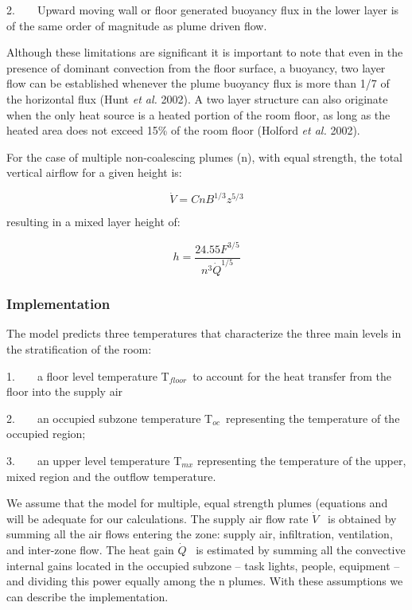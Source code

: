 2.~~~~Upward moving wall or floor generated buoyancy flux in the lower layer is of the same order of magnitude as plume driven flow.

Although these limitations are significant it is important to note that even in the presence of dominant convection from the floor surface, a buoyancy, two layer flow can be established whenever the plume buoyancy flux is more than 1/7 of the horizontal flux (Hunt \emph{et al.} 2002). A two layer structure can also originate when the only heat source is a heated portion of the room floor, as long as the heated area does not exceed 15\% of the room floor (Holford \emph{et al.} 2002).

For the case of multiple non-coalescing plumes (n), with equal strength, the total vertical airflow for a given height is:

\begin{equation}
  \dot{V} = CnB^{1/3}z^{5/3}
\end{equation}

resulting in a mixed layer height of:

\begin{equation}
  h = \frac{24.55F^{3/5}}{{n^3 \dot{Q}}^{1/5}}
\end{equation}

\subsubsection{Implementation}\label{implementation}

The model predicts three temperatures that characterize the three main levels in the stratification of the room:

1.~~~~a floor level temperature T\(_{floor}\)~to account for the heat transfer from the floor into the supply air

2.~~~~an occupied subzone temperature T\(_{oc}\)~representing the temperature of the occupied region;

3.~~~~an upper level temperature T\(_{mx}\) representing the temperature of the upper, mixed region and the outflow temperature.

We assume that the model for multiple, equal strength plumes (equations and will be adequate for our calculations. The supply air flow rate \(\dot V\) ~is obtained by summing all the air flows entering the zone: supply air, infiltration, ventilation, and inter-zone flow. The heat gain \(\dot Q\) ~is estimated by summing all the convective internal gains located in the occupied subzone -- task lights, people, equipment -- and dividing this power equally among the n plumes. With these assumptions we can describe the implementation.

